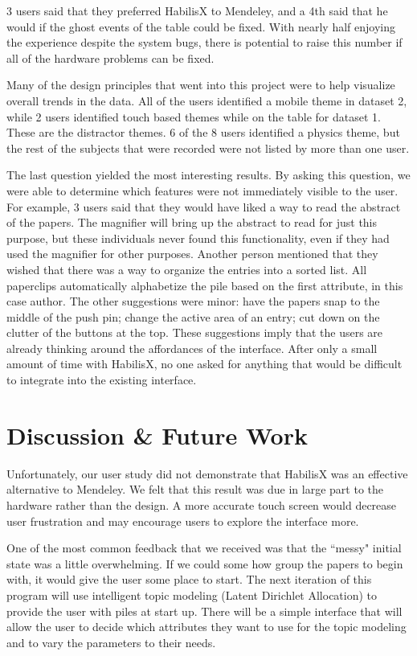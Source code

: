 \documentclass{article}
\begin{document}
	3 users said that they preferred HabilisX to Mendeley, and a 4th said that he would if the ghost events of the table could be fixed.  With nearly half enjoying the experience despite the system bugs, there is potential to raise this number if all of the hardware problems can be fixed.  
	
	Many of the design principles that went into this project were to help visualize overall trends in the data.  All of the users identified a mobile theme in dataset 2, while 2 users identified touch based themes while on the table for dataset 1.    These are the distractor themes.  6 of the 8 users identified a physics theme, but the rest of the subjects that were recorded were not listed by more than one user.  
	
	The last question yielded the most interesting results.  By asking this question, we were able to determine which features were not immediately visible to the user.  For example, 3 users said that they would have liked a way to read the abstract of the papers.  The magnifier will bring up the abstract to read for just this purpose, but these individuals never found this functionality, even if they had used the magnifier for other purposes.  Another person mentioned that they wished that there was a way to organize the entries into a sorted list.  All paperclips automatically alphabetize the pile based on the first attribute, in this case author.  The other suggestions were minor: have the papers snap to the middle of the push pin; change the active area of an entry; cut down on the clutter of the buttons at the top.  These suggestions imply that the users are already thinking around the affordances of the interface.  After only a small amount of time with HabilisX, no one asked for anything that would be difficult to integrate into the existing interface.  


\section{Discussion \& Future Work}
Unfortunately, our user study did not demonstrate that HabilisX was an effective alternative to Mendeley.  We felt that this result was due in large part to the hardware rather than the design.  A more accurate touch screen would decrease user frustration and may encourage users to explore the interface more.  

One of the most common feedback that we received was that the ``messy" initial state was a little overwhelming.  If we could some how group the papers to begin with, it would give the user some place to start.  The next iteration of this program will use intelligent topic modeling (Latent Dirichlet Allocation) to provide the user with piles at start up.  There will be a simple interface that will allow the user to decide which attributes they want to use for the topic modeling and to vary the parameters to their needs.  
\end{document}
